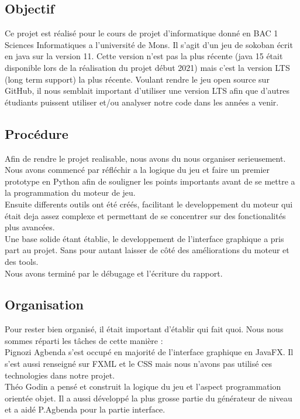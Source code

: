 \documentclass[../main.tex]{subfiles}
\begin{document}
\subsection{Objectif}
Ce projet est réalisé pour le cours de projet d'informatique donné en BAC 1 Sciences Informatiques a l'université de Mons.
Il s'agit d'un jeu de sokoban écrit en java sur la version 11.
Cette version n'est pas la plus récente (java 15 était disponible lors de la réalisation du projet début 2021) mais c'est la version LTS (long term support) la plus récente.
Voulant rendre le jeu open source sur GitHub, il nous semblait important d'utiliser une version LTS afin que d'autres étudiants puissent utiliser et/ou analyser notre code dans les années a venir.

\subsection{Procédure}
Afin de rendre le projet realisable, nous avons du nous organiser serieusement. \\
Nous avons commencé par réfléchir a la logique du jeu et faire un premier prototype en Python afin de souligner les points importants avant de se mettre a la programmation du moteur de jeu. \\
Ensuite differents outils ont été créés, facilitant le developpement du moteur qui était deja assez complexe et permettant de se concentrer sur des fonctionalités plus avancées. \\
Une base solide étant établie, le developpement de l'interface graphique a pris part au projet. Sans pour autant laisser de côté des améliorations du moteur et des tools. \\
Nous avons terminé par le débugage et l'écriture du rapport.

\subsection{Organisation}
Pour rester bien organisé, il était important d'établir qui fait quoi. Nous nous sommes réparti les tâches de cette manière : \\

Pignozi Agbenda s’est occupé en majorité de l’interface graphique en JavaFX. Il s’est aussi renseigné sur FXML et le CSS mais nous n’avons pas utilisé ces technologies dans notre projet. \\

Théo Godin a pensé et construit la logique du jeu et l’aspect programmation orientée objet. Il a aussi développé la plus grosse partie du générateur de niveau et a aidé P.Agbenda pour la partie interface. \\
\end{document}
